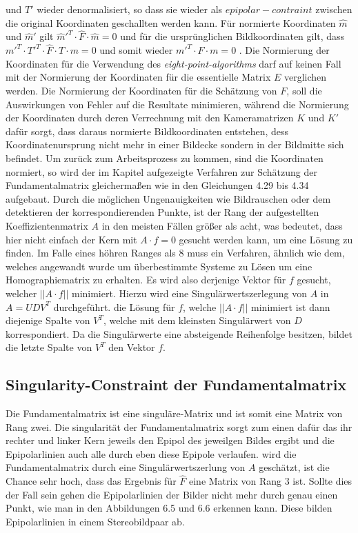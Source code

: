 und $T'$ wieder denormalisiert, so dass sie wieder als $epipolar-contraint$ zwischen die original Koordinaten geschallten werden kann. Für normierte Koordinaten $\hat{m}$ und $\hat{m}'$ gilt $\hat{m}'^T \cdot \hat{F} \cdot \hat{m} = 0$ und für die ursprünglichen Bildkoordinaten gilt, dass $m'^T \cdot T'^T \cdot \hat{F} \cdot T\cdot m = 0$ und somit wieder $m'^T \cdot F\cdot m = 0$ \cite{HZ,HZ8,Ferid}. Die Normierung der Koordinaten für die Verwendung des \textit{eight-point-algorithms} darf auf keinen Fall mit der Normierung der Koordinaten für die essentielle Matrix $E$ verglichen werden. Die Normierung der Koordinaten für die Schätzung von $F$, soll die Auswirkungen von Fehler auf die Resultate minimieren, während die Normierung der Koordinaten durch deren Verrechnung mit den Kameramatrizen $K$ und $K'$ dafür sorgt, dass daraus normierte Bildkoordinaten entstehen, dess Koordinatenursprung nicht mehr in einer Bildecke sondern in der Bildmitte sich befindet\cite{HZ}. Um zurück zum Arbeitsprozess zu kommen, sind die Koordinaten normiert, so wird der im Kapitel  aufgezeigte Verfahren zur Schätzung der Fundamentalmatrix gleichermaßen wie in den Gleichungen 4.29 bis 4.34 aufgebaut. Durch die möglichen Ungenauigkeiten wie Bildrauschen oder dem detektieren der korrespondierenden Punkte, ist der Rang der aufgestellten Koeffizientenmatrix $A$ in den meisten Fällen größer als acht, was bedeutet, dass hier nicht einfach der Kern mit $A\cdot f = 0$ gesucht werden kann, um eine Lösung zu finden. Im Falle eines höhren Ranges als 8 muss ein Verfahren, ähnlich wie dem, welches angewandt wurde um überbestimmte Systeme zu Lösen um eine Homographiematrix zu erhalten. Es wird also derjenige Vektor für $f$ gesucht, welcher $||A\cdot f||$ minimiert. Hierzu wird eine Singulärwertszerlegung von $A$ in $A  = UDV^T$ durchgeführt. die Lösung für $f$, welche $||A\cdot f||$ minimiert ist dann diejenige Spalte von $V^T$, welche mit dem kleinsten Singulärwert von $D$ korrespondiert. Da die Singulärwerte eine absteigende Reihenfolge besitzen, bildet die letzte Spalte von $V^T$ den Vektor $f$\cite{HZ}.\\


\subsection{Singularity-Constraint der Fundamentalmatrix}
\label{sec:realFun}

Die Fundamentalmatrix ist eine singuläre-Matrix und ist somit eine Matrix von Rang zwei. Die singularität der Fundamentalmatrix sorgt zum einen dafür das ihr rechter und linker Kern jeweils den Epipol des jeweilgen Bildes ergibt und die Epipolarlinien auch alle durch eben diese Epipole verlaufen. wird die Fundamentalmatrix durch eine Singulärwertszerlung von $A$ geschätzt, ist die Chance sehr hoch, dass das Ergebnis für $\hat{F}$ eine Matrix von Rang 3 ist. Sollte dies der Fall sein gehen die Epipolarlinien der Bilder nicht mehr durch genau einen Punkt, wie man in den Abbildungen 6.5 und 6.6 erkennen kann. Diese bilden Epipolarlinien in einem Stereobildpaar ab.\\

